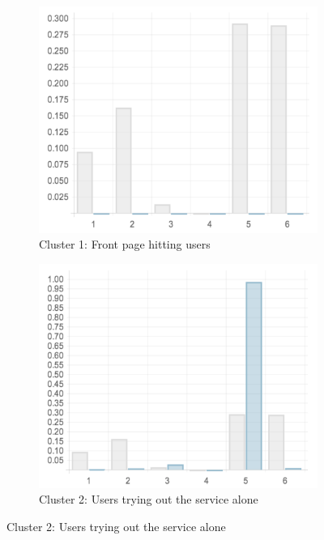 \begin{figure}
  \centering
  \begin{subfigure}[t]{0.45\textwidth}
    \includegraphics[width=\textwidth]{Figures/clusterings/confluence-post/cluster1-chart}
    \caption{Cluster 1: Front page hitting users}
    \label{fig:cluster1-chart}
  \end{subfigure}
  \hfill
  \begin{subfigure}[t]{0.45\textwidth}
    \includegraphics[width=\textwidth]{Figures/clusterings/confluence-post/cluster2-chart}
    \caption{Cluster 2: Users trying out the service alone}
    \label{fig:cluster2-chart}
  \end{subfigure}


\end{figure}
